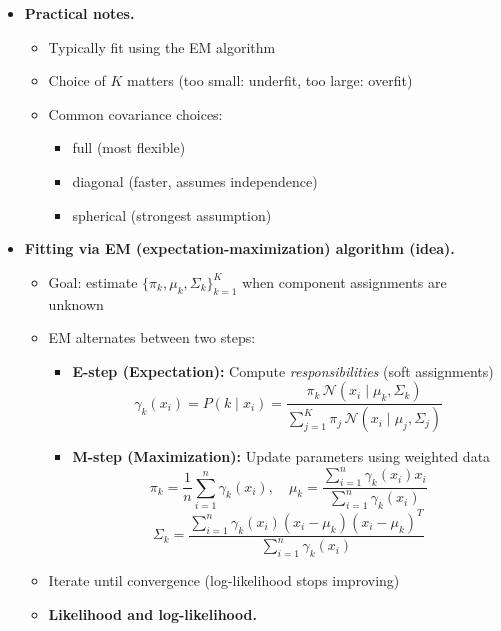 \documentclass{article}
\begin{document}
\begin{enumerate}
\begin{itemize}
    \item \textbf{Practical notes.}
    \begin{itemize}
        \item Typically fit using the EM algorithm
        \item Choice of \(K\) matters (too small: underfit, too large: overfit)
        \item Common covariance choices:
        \begin{itemize}
            \item full (most flexible)
            \item diagonal (faster, assumes independence)
            \item spherical (strongest assumption)
        \end{itemize}
    \end{itemize}
    
    \item \textbf{Fitting via EM (expectation-maximization) algorithm (idea).}

\begin{itemize}
    \item Goal: estimate \( \{\pi_k, \mu_k, \Sigma_k\}_{k=1}^K \) when component assignments are unknown

    \item EM alternates between two steps:

    \begin{itemize}
        \item \textbf{E-step (Expectation):}  
        Compute \emph{responsibilities} (soft assignments)
        \[
        \gamma_k(x_i) = P(k \mid x_i)
        = \frac{\pi_k \,\mathcal{N}(x_i \mid \mu_k, \Sigma_k)}
        {\sum_{j=1}^K \pi_j \,\mathcal{N}(x_i \mid \mu_j, \Sigma_j)}
        \]

        \item \textbf{M-step (Maximization):}  
        Update parameters using weighted data
        \[
        \pi_k = \frac{1}{n} \sum_{i=1}^n \gamma_k(x_i), \quad
        \mu_k = \frac{\sum_{i=1}^n \gamma_k(x_i)x_i}{\sum_{i=1}^n \gamma_k(x_i)}
        \]
        \[
        \Sigma_k = \frac{\sum_{i=1}^n \gamma_k(x_i)(x_i-\mu_k)(x_i-\mu_k)^T}
        {\sum_{i=1}^n \gamma_k(x_i)}
        \]
    \end{itemize}

    \item Iterate until convergence (log-likelihood stops improving)
    
    \item \textbf{Likelihood and log-likelihood.}


\end{itemize}
\end{itemize}
\end{enumerate}
\end{document}
